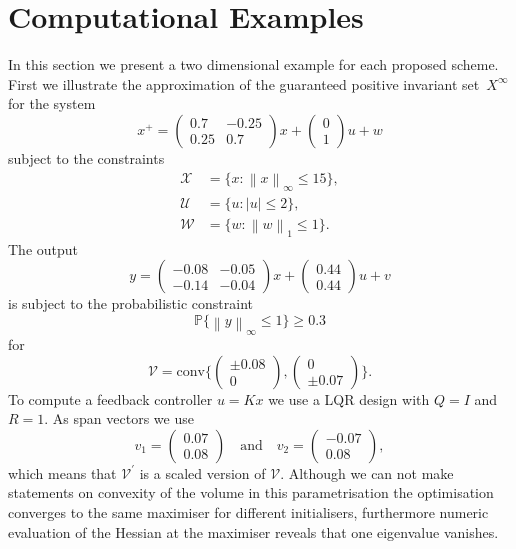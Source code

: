 \documentclass{ifacconf}
\providecommand{\abs}[1]{\left|#1\right|}
\providecommand{\norm}[1]{\left\|#1\right\|}
\providecommand{\conv}{\text{conv}}
\providecommand{\W}{\mathcal W}
\providecommand{\V}{\mathcal V}
\providecommand{\X}{\mathcal X}
\providecommand{\U}{\mathcal U}
\providecommand{\PP}{\mathbb P}
\begin{document}
\section{Computational Examples}\label{sec:examples}
%
%
%
In this section we present a two dimensional example for each proposed scheme.
%
First we illustrate the approximation of the guaranteed positive invariant set~$X^\infty$ for the system
%
\begin{equation}\label{eq:example:system:MRPI}
	x^+ = \begin{pmatrix}0.7&-0.25\\0.25&0.7\end{pmatrix}x+\begin{pmatrix}0\\1\end{pmatrix}u+w
\end{equation}
%
subject to the constraints 
\begin{align*}
\X &= \{x:\norm{x}_\infty\leq15\}, \\
\U &= \{u:\abs{u}\leq2\}, \\
\W &= \{w:\norm{w}_1\leq1\}.
\end{align*}
%
The output 
%
\begin{equation}
	y = \begin{pmatrix}-0.08&-0.05\\
   -0.14&   -0.04\end{pmatrix}x + \begin{pmatrix}
0.44\\0.44\end{pmatrix}u + v
\end{equation}
%
is subject to the probabilistic constraint
%
\begin{equation}
	\PP\{\norm{y}_\infty\leq 1\}\geq 0.3
\end{equation}
%
for 
%
$$
\V = \conv\biggl\{\begin{pmatrix}\pm0.08\\0\end{pmatrix},\begin{pmatrix}0\\\pm0.07\end{pmatrix}\biggr\}.
$$
%
To compute a feedback controller $u=Kx$ we use a LQR design with $Q=I$ and $R=1$.
%
As span vectors we use 
\[
v_1 = \begin{pmatrix} 0.07 \\ 0.08\end{pmatrix} \quad \text{and}\quad 
v_2 = \begin{pmatrix}-0.07 \\ 0.08\end{pmatrix},
\] 
which means that $\V^\prime$ is a scaled version of $\V$.
%
Although we can not make statements on convexity of the volume in this parametrisation the optimisation converges to the same maximiser for different initialisers, furthermore numeric evaluation of the Hessian at the maximiser reveals that one eigenvalue vanishes. 
%
\end{document}
